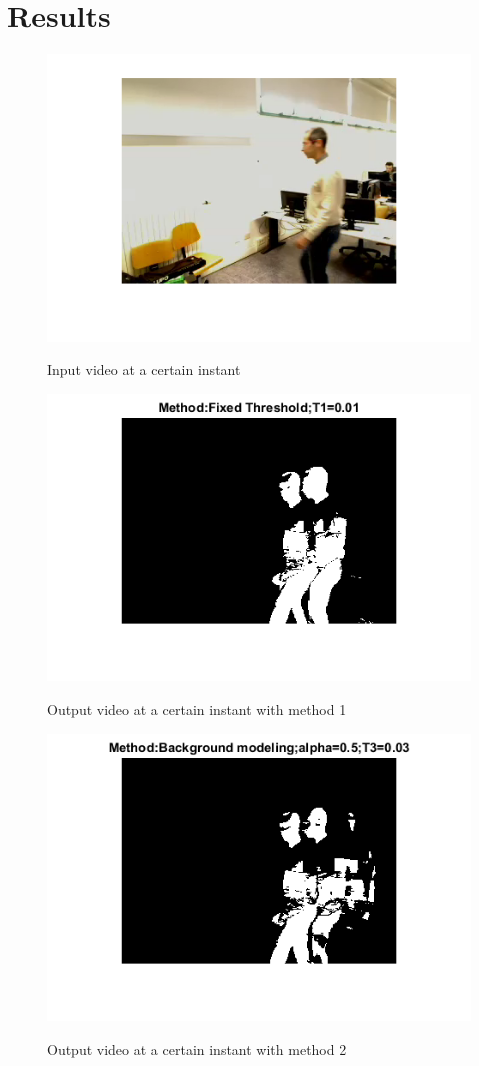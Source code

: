 \documentclass[11pt]{article}
\begin{document}
\section{Results}
\begin{figure}[H]
	\centering
	{\includegraphics[width=12cm]{images/inst.png} }
    \caption{Input video at a certain instant}
    \label{fig:out1}
\end{figure}
\begin{figure}[H]
	\centering
	{\includegraphics[width=12cm]{images/inst_1.png} }
    \caption{Output video at a certain instant with method 1}
    \label{fig:out1}
\end{figure}
\begin{figure}[H]
	\centering
	{\includegraphics[width=12cm]{images/inst_2.png} }
    \caption{Output video at a certain instant with method 2}
    \label{fig:out2}
\end{figure}
\end{document}
